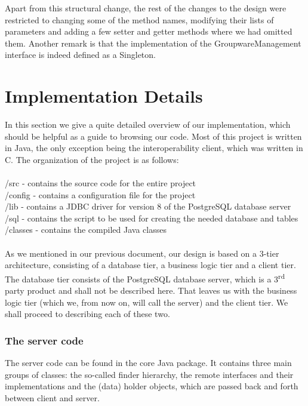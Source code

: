\documentclass[a4paper,10pt]{article}
\begin{document}
Apart from this structural change, the rest of the changes to the design were restricted
to changing some of the method names, modifying their lists of parameters and adding
a few setter and getter methods where we had omitted them. Another remark is that
the implementation of the GroupwareManagement interface is indeed defined as a
Singleton.

\section{Implementation Details}

In this section we give a quite detailed overview of our implementation, which should
be helpful as a guide to browsing our code. Most of this project is written in Java, the
only exception being the interoperability client, which was written in C. The organization
of the project is as follows:\\
\\
\indent/src - contains the source code for the entire project\\
\indent/config - contains a configuration file for the project\\
\indent/lib - contains a JDBC driver for version 8 of the PostgreSQL database server\\
\indent/sql - contains the script to be used for creating the needed database and tables\\
\indent/classes - contains the compiled Java classes\\
\\
\indent As we mentioned in our previous document, our design is based on a 3-tier architecture,
consisting of a database tier, a business logic tier and a client tier. The database tier consists
of the PostgreSQL database server, which is a 3\textsuperscript{rd} party product and
shall not be described here. That leaves us with the business logic tier (which we, from now
on, will call the server) and the client tier. We shall proceed to describing each of these two.

\subsubsection*{The server code}

The server code can be found in the core Java package. It contains three main groups of classes:
the so-called finder hierarchy, the remote interfaces and their implementations and the
(data) holder objects, which are passed back and forth between client and server.
\end{document}
